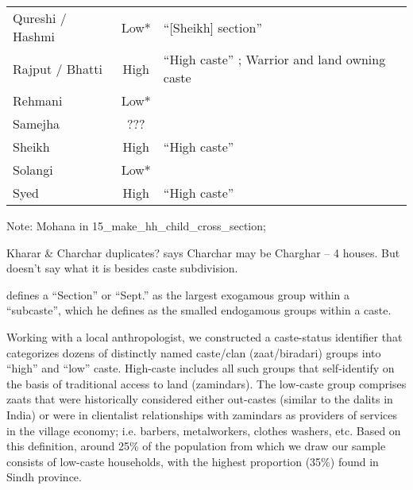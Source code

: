 \documentclass[Eubank_pk_ethnic_sorting.tex]{subfiles}
\begin{document}
\begin{table}[]
\begin{tabular}{lcl}
Qureshi / Hashmi              & Low*   			&  ``[Sheikh] section'' \citep[p. 353]{Blunt:1969vq}   \\
Rajput / Bhatti               & High  			& ``High caste'' \citep[p. 268]{Blunt:1969vq}; Warrior and land owning caste \citep[p. 353]{Blunt:1969vq}  \\
Rehmani                       & Low*   			&       \\
Samejha                       & ???    			&       \\
Sheikh                        & High  			& ``High caste'' \citep[p. 268]{Blunt:1969vq} \\
Solangi                       & Low*   			&       \\
Syed                          & High  			& ``High caste'' \citep[p. 268]{Blunt:1969vq}    
\end{tabular}
\end{table}


Note: Mohana in 15\_make\_hh\_child\_cross\_section; 

Kharar \& Charchar duplicates? \cite[p. 344]{Blunt:1969vq} says Charchar may be Charghar -- 4 houses. But doesn't say what it is besides caste subdivision.  

\cite[p. 10]{Blunt:1969vq} defines a ``Section'' or ``Sept.'' as the largest exogamous group within a ``subcaste'', which he defines as the smalled endogamous groups within a caste. 


Working with a local anthropologist, we constructed a caste-status identifier that categorizes dozens of distinctly named caste/clan (zaat/biradari) groups into “high” and ``low'' caste. High-caste includes all such groups that self-identify on the basis of traditional access to land (zamindars). The low-caste group comprises zaats that were historically considered either out-castes (similar to the dalits in India) or were in clientalist relationships with zamindars as providers of services in the village economy; i.e. barbers, metalworkers, clothes washers, etc. Based on this definition, around 25\% of the population from which we draw our sample consists of low-caste households, with the highest proportion (35\%) found in Sindh province.
\end{document}
